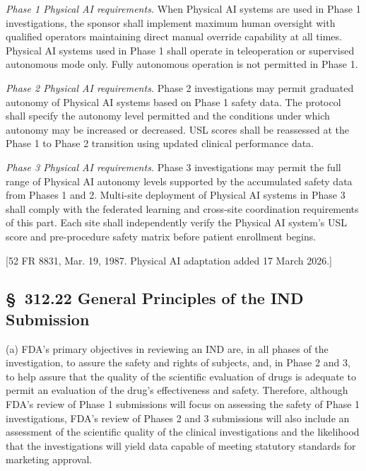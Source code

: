 \documentclass[11pt]{article}
\begin{document}
\begin{description}[leftmargin=0.8cm,style=sameline]
\item[(i)] \textit{Phase 1 Physical AI requirements.} When Physical AI systems are used in Phase 1 investigations, the sponsor shall implement maximum human oversight with qualified operators maintaining direct manual override capability at all times. Physical AI systems used in Phase 1 shall operate in teleoperation or supervised autonomous mode only. Fully autonomous operation is not permitted in Phase 1.
\item[(ii)] \textit{Phase 2 Physical AI requirements.} Phase 2 investigations may permit graduated autonomy of Physical AI systems based on Phase 1 safety data. The protocol shall specify the autonomy level permitted and the conditions under which autonomy may be increased or decreased. USL scores shall be reassessed at the Phase 1 to Phase 2 transition using updated clinical performance data.
\item[(iii)] \textit{Phase 3 Physical AI requirements.} Phase 3 investigations may permit the full range of Physical AI autonomy levels supported by the accumulated safety data from Phases 1 and 2. Multi-site deployment of Physical AI systems in Phase 3 shall comply with the federated learning and cross-site coordination requirements of this part. Each site shall independently verify the Physical AI system's USL score and pre-procedure safety matrix before patient enrollment begins.
\end{description}

[52 FR 8831, Mar. 19, 1987. Physical AI adaptation added 17 March 2026.]

\subsection{\S~312.22 General Principles of the IND Submission}

(a) FDA's primary objectives in reviewing an IND are, in all phases of the investigation, to assure the safety and rights of subjects, and, in Phase 2 and 3, to help assure that the quality of the scientific evaluation of drugs is adequate to permit an evaluation of the drug's effectiveness and safety. Therefore, although FDA's review of Phase 1 submissions will focus on assessing the safety of Phase 1 investigations, FDA's review of Phases 2 and 3 submissions will also include an assessment of the scientific quality of the clinical investigations and the likelihood that the investigations will yield data capable of meeting statutory standards for marketing approval.
\end{document}
